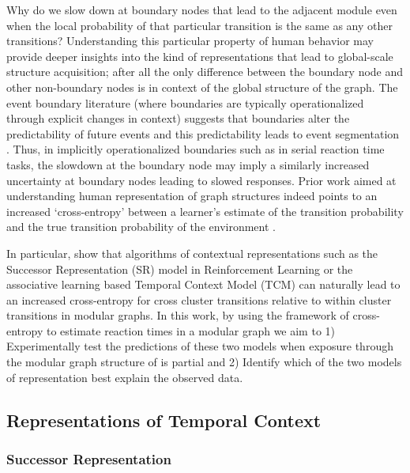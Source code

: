 Why do we slow down at boundary nodes that lead to the adjacent module even when the local probability of that particular transition is the same as any other transitions? Understanding this particular property of human behavior may provide deeper insights into the kind of representations that lead to global-scale structure acquisition; after all the only difference between the boundary node and other non-boundary nodes is in context of the global structure of the graph. The event boundary literature (where boundaries are typically operationalized through explicit changes in context) suggests that boundaries alter the predictability of future events and this predictability leads to event segmentation \cite{zacks2007event, clewett2019transcending}. Thus, in implicitly operationalized boundaries such as in serial reaction time tasks, the slowdown at the boundary node may imply a similarly increased uncertainty at boundary nodes leading to slowed responses. Prior work aimed at understanding human representation of graph structures indeed points to an increased `cross-entropy' between a learner's estimate of the transition probability and the true transition probability of the environment \cite{lynn2020abstract, lynn2020humans, lynn2020human}. 


In particular, \cite{lynn2020human} show that algorithms of contextual representations such as the Successor Representation (SR) model in Reinforcement Learning \cite{dayan1993improving, momennejad2017successor, gershman2018successor} or the associative learning based Temporal Context Model (TCM) can naturally lead to an increased cross-entropy for cross cluster transitions relative to within cluster transitions in modular graphs. In this work, by using the framework of cross-entropy to estimate reaction times in a modular graph we aim to 1) Experimentally test the predictions of these two models when exposure through the modular graph structure of is partial and 2) Identify which of the two models of representation best explain the observed data. 

\subsection{Representations of Temporal Context}

\subsubsection*{Successor Representation}\label{successor-representation}

